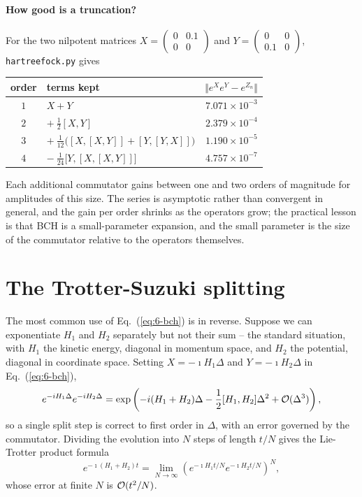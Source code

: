\paragraph{How good is a truncation?}
For the two nilpotent matrices
$X=\left(\begin{smallmatrix}0 & 0.1\\ 0 & 0\end{smallmatrix}\right)$ and
$Y=\left(\begin{smallmatrix}0 & 0\\ 0.1 & 0\end{smallmatrix}\right)$,
\texttt{hartreefock.py} gives
\begin{center}
\renewcommand{\arraystretch}{1.2}
\begin{tabular}{clr}
\toprule
order & terms kept & $\Vert e^{X}e^{Y}-e^{Z_n}\Vert$\\
\midrule
$1$ & $X+Y$ & $7.071\times10^{-3}$\\
$2$ & $+\ \tfrac12[X,Y]$ & $2.379\times10^{-4}$\\
$3$ & $+\ \tfrac1{12}\big([X,[X,Y]]+[Y,[Y,X]]\big)$ & $1.190\times10^{-5}$\\
$4$ & $-\ \tfrac1{24}\big[Y,[X,[X,Y]]\big]$ & $4.757\times10^{-7}$\\
\bottomrule
\end{tabular}
\end{center}
Each additional commutator gains between one and two orders of magnitude for
amplitudes of this size.  The series is asymptotic rather than convergent in
general, and the gain per order shrinks as the operators grow; the practical
lesson is that BCH is a small-parameter expansion, and the small parameter is
the size of the commutator relative to the operators themselves.

\section{The Trotter-Suzuki splitting}
\label{sec:trotter}

The most common use of Eq.~(\ref{eq:6-bch}) is in reverse.  Suppose we can
exponentiate $H_1$ and $H_2$ separately but not their sum -- the standard
situation, with $H_1$ the kinetic energy, diagonal in momentum space, and
$H_2$ the potential, diagonal in coordinate space.  Setting
$X=-\imath H_1\Delta$ and $Y=-\imath H_2\Delta$ in
Eq.~(\ref{eq:6-bch}),
\begin{equation}
  e^{-i H_1\Delta}e^{-i H_2\Delta}
  = \exp\left(-i (H_1+H_2)\Delta
      - \frac{1}{2}[H_1,H_2]\Delta^2 + \mathcal{O}(\Delta^3)\right),
  \label{eq:6-trotterbch}
\end{equation}
so a single split step is correct to first order in $\Delta$, with an error
governed by the commutator.  Dividing the evolution into $N$ steps of length
$t/N$ gives the Lie-Trotter product formula
\begin{equation}
  e^{-\imath(H_1+H_2)t}
  = \lim_{N\to\infty}\left(e^{-\imath H_1 t/N}
      e^{-\imath H_2 t/N}\right)^{N},
  \label{eq:6-trotter}
\end{equation}
whose error at finite $N$ is $\mathcal{O}(t^2/N)$.

